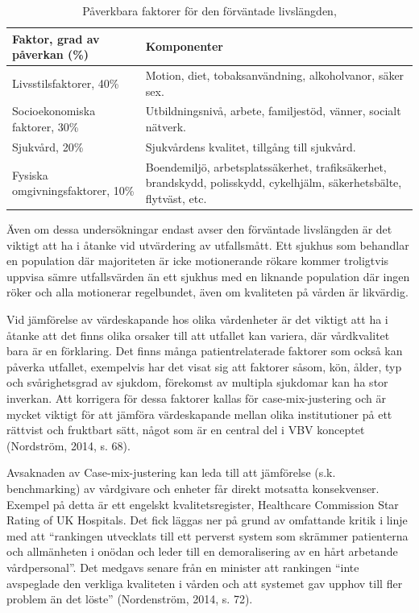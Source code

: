 \begin{table}[h]
\centering
\caption{Påverkbara faktorer för den förväntade livslängden,}
\label{tab:livslangd}
\begin{tabular}{|p{6cm}|p{6cm}|}
\hline
Faktor, grad av påverkan (\%)    & Komponenter                                                                                                                        \\ \hline
Livsstilsfaktorer, 40\%          & Motion, diet, tobaksanvändning, alkoholvanor, säker sex.                                                                           \\ \hline
Socioekonomiska faktorer, 30\%   & Utbildningsnivå, arbete, familjestöd, vänner, socialt nätverk.                                                                     \\ \hline
Sjukvård, 20\%                   & Sjukvårdens kvalitet, tillgång till sjukvård. \\ \hline

Fysiska omgivningsfaktorer, 10\% & Boendemiljö, arbetsplatssäkerhet, trafiksäkerhet, brandskydd, polisskydd, cykelhjälm, säkerhetsbälte, flytväst, etc.               \\ \hline
\end{tabular}
\end{table}

Även om dessa undersökningar endast avser den förväntade livslängden är det viktigt att ha i åtanke vid utvärdering av utfallsmått. Ett sjukhus som behandlar en population där majoriteten är icke motionerande rökare kommer troligtvis uppvisa sämre utfallsvärden än ett sjukhus med en liknande population där ingen röker och alla motionerar regelbundet, även om kvaliteten på vården är likvärdig.

Vid jämförelse av värdeskapande hos olika vårdenheter är det viktigt att ha i åtanke att det finns olika orsaker till att utfallet kan variera, där vårdkvalitet bara är en förklaring. Det finns många patientrelaterade faktorer som också kan påverka utfallet, exempelvis har det visat sig att faktorer såsom, kön, ålder, typ och svårighetsgrad av sjukdom, förekomst av multipla sjukdomar kan ha stor inverkan. Att korrigera för dessa faktorer kallas för case-mix-justering och är mycket viktigt för att jämföra värdeskapande mellan olika institutioner på ett rättvist och fruktbart sätt, något som är en central del i VBV konceptet (Nordström, 2014, s. 68).

Avsaknaden av Case-mix-justering kan leda till att jämförelse (s.k. benchmarking) av vårdgivare och enheter får direkt motsatta konsekvenser. Exempel på detta är ett engelskt kvalitetsregister, Healthcare Commission Star Rating of UK Hospitals. Det fick läggas ner på grund av omfattande kritik i linje med att “rankingen utvecklats till ett perverst system som skrämmer patienterna och allmänheten i onödan och leder till en demoralisering av en hårt arbetande vårdpersonal”. Det medgavs senare från en minister att rankingen “inte avspeglade den verkliga kvaliteten i vården och att systemet gav upphov till fler problem än det löste” (Nordenström, 2014, s. 72).

